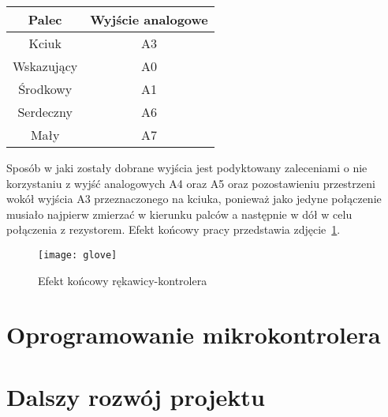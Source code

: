 \begin{center}
\begin{tabular}{|c|c|}
\hline
Palec & Wyjście analogowe \\ \hline
Kciuk & A3 \\ \hline
Wskazujący & A0 \\ \hline
Środkowy & A1 \\ \hline
Serdeczny & A6 \\ \hline
Mały & A7 \\ \hline
\hline
\end{tabular}
\end{center}

Sposób w jaki zostały dobrane wyjścia jest podyktowany zaleceniami o nie korzystaniu z wyjść analogowych A4 oraz A5 oraz pozostawieniu przestrzeni wokół wyjścia A3 przeznaczonego na kciuka, ponieważ jako jedyne połączenie musiało najpierw zmierzać w kierunku palców a następnie w dół w celu połączenia z rezystorem. Efekt końcowy pracy przedstawia zdjęcie~\ref{fig:glove}.

\begin{figure}[h]
\centering
\texttt{[image: glove]}
\caption{Efekt końcowy rękawicy-kontrolera}
\label{fig:glove}
\end{figure}

\section{Oprogramowanie mikrokontrolera}
\label{sec:oprogramowanie}


\section{Dalszy rozwój projektu}
\label{sec:rozwojPro}
